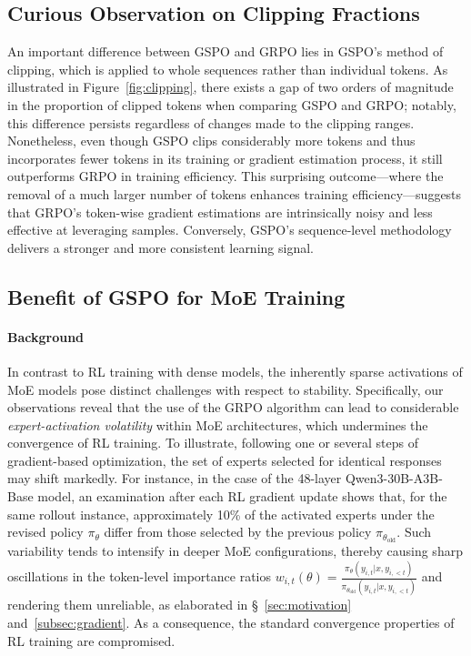 \subsection{Curious Observation on Clipping Fractions}

An important difference between GSPO and GRPO lies in GSPO's method of clipping, which is applied to whole sequences rather than individual tokens. As illustrated in Figure~\ref{fig:clipping}, there exists a gap of two orders of magnitude in the proportion of clipped tokens when comparing GSPO and GRPO; notably, this difference persists regardless of changes made to the clipping ranges. Nonetheless, even though GSPO clips considerably more tokens and thus incorporates fewer tokens in its training or gradient estimation process, it still outperforms GRPO in training efficiency. This surprising outcome—where the removal of a much larger number of tokens enhances training efficiency—suggests that GRPO’s token-wise gradient estimations are intrinsically noisy and less effective at leveraging samples. Conversely, GSPO's sequence-level methodology delivers a stronger and more consistent learning signal.

\subsection{Benefit of GSPO for MoE Training}
\label{subsec:routing_replay}

\paragraph{Background}
In contrast to RL training with dense models, the inherently sparse activations of MoE models pose distinct challenges with respect to stability. Specifically, our observations reveal that the use of the GRPO algorithm can lead to considerable \textit{expert-activation volatility} within MoE architectures, which undermines the convergence of RL training. To illustrate, following one or several steps of gradient-based optimization, the set of experts selected for identical responses may shift markedly. For instance, in the case of the 48-layer Qwen3-30B-A3B-Base model, an examination after each RL gradient update shows that, for the same rollout instance, approximately 10\% of the activated experts under the revised policy $\pi_{\theta}$ differ from those selected by the previous policy $\pi_{\theta_\text{old}}$. Such variability tends to intensify in deeper MoE configurations, thereby causing sharp oscillations in the token-level importance ratios $w_{i,t}(\theta) = \frac{ \pi_{\theta} (y_{i,t} | x, y_{i,<t}) }{ \pi_{\theta_\text{old}} (y_{i,t} | x,y_{i,<t})}$ and rendering them unreliable, as elaborated in \S~\ref{sec:motivation} and~\ref{subsec:gradient}. As a consequence, the standard convergence properties of RL training are compromised.

